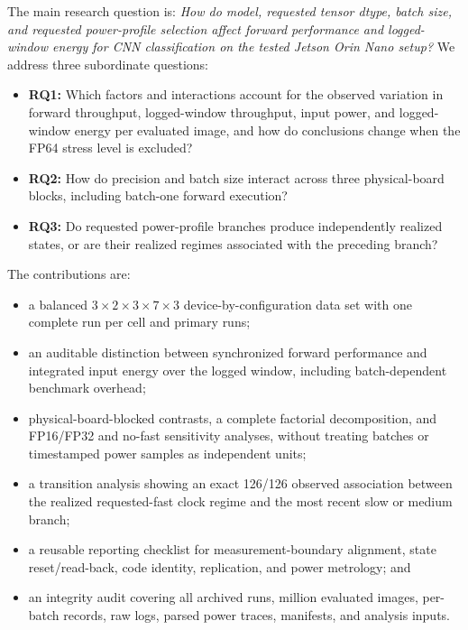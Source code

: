 \documentclass[electronics,article,submit,pdftex,moreauthors]{Definitions/mdpi}
\begin{document}
The main research question is: \emph{How do model, requested tensor dtype, batch size, and requested power-profile selection affect forward performance and logged-window energy for CNN classification on the tested Jetson Orin Nano setup?} We address three subordinate questions:
\begin{itemize}
    \item \textbf{RQ1:} Which factors and interactions account for the observed variation in forward throughput, logged-window throughput, input power, and logged-window energy per evaluated image, and how do conclusions change when the FP64 stress level is excluded?
    \item \textbf{RQ2:} How do precision and batch size interact across three physical-board blocks, including batch-one forward execution?
    \item \textbf{RQ3:} Do requested power-profile branches produce independently realized states, or are their realized regimes associated with the preceding branch?
\end{itemize}

The contributions are:
\begin{itemize}
    \item a balanced $3\times2\times3\times7\times3$ device-by-configuration data set with one complete run per cell and \PrimaryRuns{} primary runs;
    \item an auditable distinction between synchronized forward performance and integrated input energy over the logged window, including batch-dependent benchmark overhead;
    \item physical-board-blocked contrasts, a complete factorial decomposition, and FP16/FP32 and no-fast sensitivity analyses, without treating batches or timestamped power samples as independent units;
    \item a transition analysis showing an exact 126/126 observed association between the realized requested-fast clock regime and the most recent slow or medium branch;
    \item a reusable reporting checklist for measurement-boundary alignment, state reset/read-back, code identity, replication, and power metrology; and
    \item an integrity audit covering all \TotalRuns{} archived runs, \TotalEvaluatedImagesMillions{} million evaluated images, per-batch records, raw logs, parsed power traces, manifests, and analysis inputs.
\end{itemize}
\end{document}
